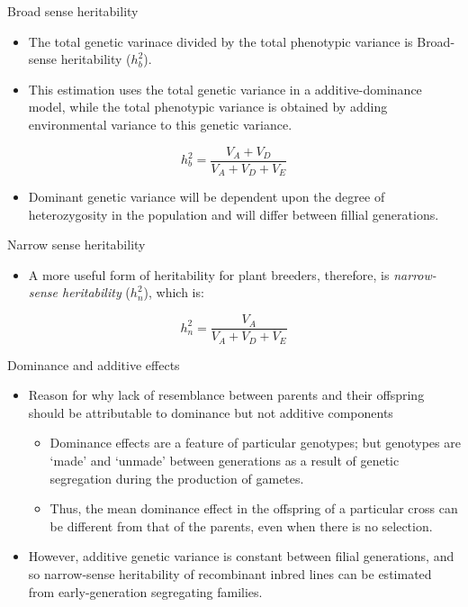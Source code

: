 \documentclass[11pt,dvipsnames,ignorenonframetext,aspectratio=169]{beamer}
\providecommand{\tightlist}{%
  \setlength{\itemsep}{0pt}\setlength{\parskip}{0pt}}
\begin{document}
\begin{frame}{Broad sense heritability}
\protect\hypertarget{broad-sense-heritability}{}
\begin{itemize}
\tightlist
\item
  The total genetic varinace divided by the total phenotypic variance is
  Broad-sense heritability (\(h_b^2\)).
\item
  This estimation uses the total genetic variance in a
  additive-dominance model, while the total phenotypic variance is
  obtained by adding environmental variance to this genetic variance.
\end{itemize}

\[
h_b^2 = \frac{V_A + V_D}{V_A + V_D + V_E}
\tag{i}
\]

\begin{itemize}
\tightlist
\item
  Dominant genetic variance will be dependent upon the degree of
  heterozygosity in the population and will differ between fillial
  generations.
\end{itemize}
\end{frame}

\begin{frame}{Narrow sense heritability}
\protect\hypertarget{narrow-sense-heritability}{}
\begin{itemize}
\tightlist
\item
  A more useful form of heritability for plant breeders, therefore, is
  \emph{narrow-sense heritability} (\(h_n^2\)), which is:
\end{itemize}

\[
h_n^2 = \frac{V_A}{V_A+V_D+V_E}
\tag{ii}
\]
\end{frame}

\begin{frame}{Dominance and additive effects}
\protect\hypertarget{dominance-and-additive-effects}{}
\begin{itemize}
\tightlist
\item
  Reason for why lack of resemblance between parents and their offspring
  should be attributable to dominance but not additive components

  \begin{itemize}
  \tightlist
  \item
    Dominance effects are a feature of particular genotypes; but
    genotypes are `made' and `unmade' between generations as a result of
    genetic segregation during the production of gametes.
  \item
    Thus, the mean dominance effect in the offspring of a particular
    cross can be different from that of the parents, even when there is
    no selection.
  \end{itemize}
\item
  However, additive genetic variance is constant between filial
  generations, and so narrow-sense heritability of recombinant inbred
  lines can be estimated from early-generation segregating families.
\end{itemize}
\end{frame}
\end{document}
